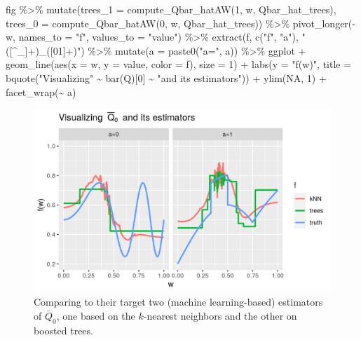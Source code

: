 \documentclass[
  11pt,
  openright,twoside]{book}
\newenvironment{Shaded}{\begin{snugshade}}{\end{snugshade}}
\newcommand{\AttributeTok}[1]{\textcolor[rgb]{0.77,0.63,0.00}{#1}}
\newcommand{\ConstantTok}[1]{\textcolor[rgb]{0.00,0.00,0.00}{#1}}
\newcommand{\DecValTok}[1]{\textcolor[rgb]{0.00,0.00,0.81}{#1}}
\newcommand{\FunctionTok}[1]{\textcolor[rgb]{0.00,0.00,0.00}{#1}}
\newcommand{\NormalTok}[1]{#1}
\newcommand{\SpecialCharTok}[1]{\textcolor[rgb]{0.00,0.00,0.00}{#1}}
\newcommand{\StringTok}[1]{\textcolor[rgb]{0.31,0.60,0.02}{#1}}
\newcommand{\Qbar}{\bar{Q}}
\theoremstyle{definition}
\theoremstyle{definition}
\theoremstyle{definition}
\theoremstyle{definition}
\theoremstyle{remark}
\begin{document}
\begin{Shaded}
\begin{Highlighting}[]
\NormalTok{fig }\SpecialCharTok{\%\textgreater{}\%}
  \FunctionTok{mutate}\NormalTok{(}\AttributeTok{trees\_1 =} \FunctionTok{compute\_Qbar\_hatAW}\NormalTok{(}\DecValTok{1}\NormalTok{, w, Qbar\_hat\_trees),}
         \AttributeTok{trees\_0 =} \FunctionTok{compute\_Qbar\_hatAW}\NormalTok{(}\DecValTok{0}\NormalTok{, w, Qbar\_hat\_trees)) }\SpecialCharTok{\%\textgreater{}\%}
  \FunctionTok{pivot\_longer}\NormalTok{(}\SpecialCharTok{{-}}\NormalTok{w, }\AttributeTok{names\_to =} \StringTok{"f"}\NormalTok{, }\AttributeTok{values\_to =} \StringTok{"value"}\NormalTok{) }\SpecialCharTok{\%\textgreater{}\%}
  \FunctionTok{extract}\NormalTok{(f, }\FunctionTok{c}\NormalTok{(}\StringTok{"f"}\NormalTok{, }\StringTok{"a"}\NormalTok{), }\StringTok{"([\^{}\_]+)\_([01]+)"}\NormalTok{) }\SpecialCharTok{\%\textgreater{}\%}
  \FunctionTok{mutate}\NormalTok{(}\AttributeTok{a =} \FunctionTok{paste0}\NormalTok{(}\StringTok{"a="}\NormalTok{, a)) }\SpecialCharTok{\%\textgreater{}\%}
\NormalTok{  ggplot }\SpecialCharTok{+}
  \FunctionTok{geom\_line}\NormalTok{(}\FunctionTok{aes}\NormalTok{(}\AttributeTok{x =}\NormalTok{ w, }\AttributeTok{y =}\NormalTok{ value, }\AttributeTok{color =}\NormalTok{ f), }\AttributeTok{size =} \DecValTok{1}\NormalTok{) }\SpecialCharTok{+}
  \FunctionTok{labs}\NormalTok{(}\AttributeTok{y =} \StringTok{"f(w)"}\NormalTok{,}
       \AttributeTok{title =} \FunctionTok{bquote}\NormalTok{(}\StringTok{"Visualizing"} \SpecialCharTok{\textasciitilde{}} \FunctionTok{bar}\NormalTok{(Q)[}\DecValTok{0}\NormalTok{] }\SpecialCharTok{\textasciitilde{}} \StringTok{"and its estimators"}\NormalTok{)) }\SpecialCharTok{+}
  \FunctionTok{ylim}\NormalTok{(}\ConstantTok{NA}\NormalTok{, }\DecValTok{1}\NormalTok{) }\SpecialCharTok{+}
  \FunctionTok{facet\_wrap}\NormalTok{(}\SpecialCharTok{\textasciitilde{}}\NormalTok{ a)}
\end{Highlighting}
\end{Shaded}

\begin{figure}

{\centering \includegraphics[width=0.7\linewidth]{img/estimate-Qbar-five-1} 

}

\caption{Comparing to their target two (machine learning-based) estimators of \(\Qbar_{0}\), one based on the \(k\)-nearest neighbors and the other on boosted trees.}\label{fig:estimate-Qbar-five}
\end{figure}
\end{document}
